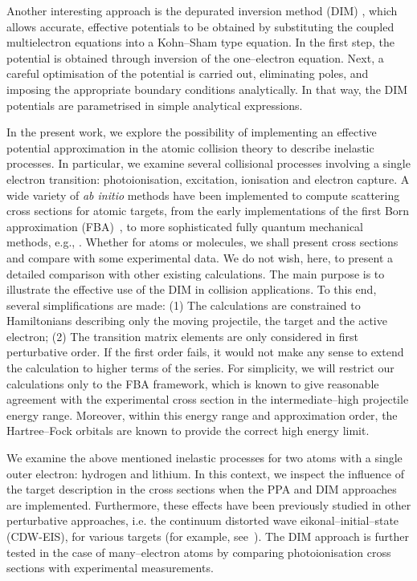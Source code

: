 \documentclass[10pt]{article}
\begin{document}
Another interesting approach is the depurated inversion method 
(DIM) \cite{Mendez2015,Mendez2016,Mendez2018}, which allows accurate, 
effective potentials to be obtained by substituting the coupled 
multielectron equations into a Kohn--Sham type equation. In the first 
step, the potential is obtained through inversion of the 
one--electron equation. Next, a careful optimisation of the potential 
is carried out, eliminating poles, and imposing the appropriate 
boundary conditions analytically. In that way, the DIM potentials are 
parametrised in simple analytical expressions.

In the present work, we explore the possibility of implementing an 
effective potential approximation in the atomic collision theory to 
describe inelastic processes. In particular, we examine several 
collisional processes involving a single electron transition: 
photoionisation, excitation, ionisation and electron capture. 
A wide variety of {\it ab initio} methods have been implemented to
compute scattering cross sections for atomic targets, from the 
early implementations of the first Born approximation 
(FBA)~\cite{Bates1962,McDowell1961}, to more sophisticated fully
quantum mechanical methods, e.g., 
\cite{Pindzola2007,Burke2011,Bray2017,Pindzola2016}. 
Whether for atoms or molecules, we shall present cross sections and 
compare with some experimental data. We do not wish, here, to present 
a detailed comparison with other existing calculations. The main 
purpose is to illustrate the effective use of the DIM in collision 
applications. To this end, several simplifications are made: (1) The calculations are constrained to Hamiltonians describing only the 
moving projectile, the target and the active electron; (2) The 
transition matrix elements are only considered in first perturbative 
order. If the first order fails, it would not make any sense to 
extend the calculation to higher terms of the series. For simplicity, 
we will restrict our calculations only to the FBA framework, which is 
known to give reasonable agreement with the experimental cross 
section in the intermediate--high projectile energy range. Moreover, 
within this energy range and approximation order, the Hartree--Fock 
orbitals are known to provide the correct high energy limit.

We examine the above mentioned inelastic processes for two atoms with 
a single outer electron: hydrogen and lithium. In this context, we 
inspect the influence of the target description in the cross sections 
when the PPA and DIM approaches are implemented. Furthermore, these 
effects have been previously studied in other perturbative approaches,
i.e. the continuum distorted wave eikonal--initial--state (CDW-EIS), 
for various targets (for example, see~\cite{Kirchner1998,Fiori2001}).
The DIM approach is further tested in the case of many--electron 
atoms by comparing photoionisation cross sections with experimental 
measurements. 
\end{document}
